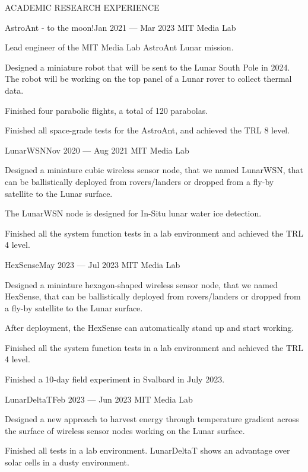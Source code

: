 \documentclass{resume} %
\begin{document}
\begin{rSection}{ACADEMIC RESEARCH EXPERIENCE}
\begin{rSubsection}{AstroAnt - to the moon!}{Jan 2021 --- Mar 2023}{ }{MIT Media Lab}
    \item Lead engineer of the MIT Media Lab AstroAnt Lunar mission.
    \item Designed a miniature robot that will be sent to the Lunar South Pole in 2024. The robot will be working on the top panel of a Lunar rover to collect thermal data.
    \item Finished four parabolic flights, a total of 120 parabolas.
    \item Finished all space-grade tests for the AstroAnt, and achieved the TRL 8 level.
\end{rSubsection}

\begin{rSubsection}{LunarWSN}{Nov 2020 --- Aug 2021}{ }{MIT Media Lab}
\item Designed a miniature cubic wireless sensor node, that we named LunarWSN, that can be ballistically deployed from rovers/landers or dropped from a fly-by satellite to the Lunar surface.
\item The LunarWSN node is designed for In-Situ lunar water ice detection.
\item Finished all the system function tests in a lab environment and achieved the TRL 4 level.
\end{rSubsection}

\newpage

\begin{rSubsection}{HexSense}{May 2023 --- Jul 2023}{ }{MIT Media Lab}
\item Designed a miniature hexagon-shaped wireless sensor node, that we named HexSense, that can be ballistically deployed from rovers/landers or dropped from a fly-by satellite to the Lunar surface.
\item After deployment, the HexSense can automatically stand up and start working.
\item Finished all the system function tests in a lab environment and achieved the TRL 4 level.
\item Finished a 10-day field experiment in Svalbard in July 2023.
\end{rSubsection}

\begin{rSubsection}{LunarDeltaT}{Feb 2023 --- Jun 2023}{ }{MIT Media Lab}
\item Designed a new approach to harvest energy through temperature gradient across the surface of wireless sensor nodes working on the Lunar surface.
\item Finished all tests in a lab environment. LunarDeltaT shows an advantage over solar cells in a dusty environment.
\end{rSubsection}


\end{rSection}
\end{document}
